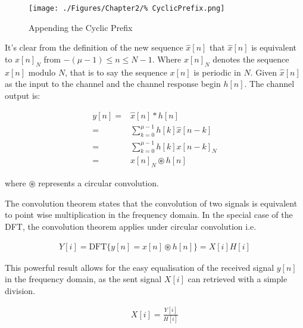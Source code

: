 \begin{figure}[h!]
	\texttt{[image: ./Figures/Chapter2/\%
	CyclicPrefix.png]}
	\caption{Appending the Cyclic Prefix}
	\label{fig:CyclicPrefix}
\end{figure}

It's clear from the definition of the new sequence $\hat{x}[n]$ that %
$\hat{x}[n]$ is equivalent to $x[n]_{N}$ from $-(\mu-1) \leq n \leq %
N-1$. Where $x[n]_{N}$ denotes the sequence $x[n]$ modulo $N$, that %
is to say the sequence $x[n]$ is periodic in $N$. Given $\hat{x}[n]$ %
as the input to the channel and the channel response begin $h[n]$. %
The channel output is:

\begin{align}
	y[n] =& \hat{x}[n]*h[n]\\
	     =& \sum_{k=0}^{\mu-1}h[k]\hat{x}[n-k]\\
	     =& \sum_{k=0}^{\mu-1}h[k]x[n-k]_{N}\\
	     =& x[n]_{N}\circledast h[n]
\end{align}

where $\circledast$ represents a circular convolution. %

The convolution theorem states that the convolution %
of two  signals is equivalent to point wise %
multiplication in the frequency domain\cite{MathWorldConvolution%
Theorem}. In the special case of the DFT, the convolution theorem %
applies under circular convolution i.e.

\begin{align}
	Y[i] = \text{DFT}\{y[n] = x[n]\circledast h[n]\} = X[i]H[i]	
\end{align}

This powerful result allows for the easy equalisation of the received %
signal $y[n]$ in the frequency domain, as the sent signal $X[i]$ can %
retrieved with a simple division.

\begin{align}
	X[i] = \frac{Y[i]}{H[i]}
\end{align}
